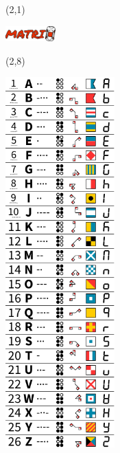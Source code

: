 \documentclass{extarticle}
\begin{document}
\pagecolor{sand}
\pagestyle{empty}


\begin{textblock}{42}(2,1)
\vfill
{\centerline{\includegraphics[height=6mm]{tools/images/logo-matrix.pdf}}} 
\vfill
\end{textblock}

\begin{textblock}{42}(2,8)
\vfill
{\centerline{\includegraphics[width=42mm]{tools/main.pdf}}} 
\vfill
\end{textblock}
\end{document}

